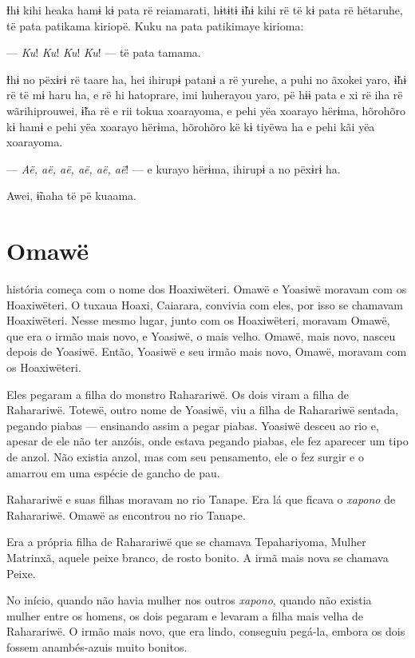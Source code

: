 Ɨhɨ kihi heaka hamɨ kɨ pata rë reiamarati, hɨtɨtɨ ɨ̃hɨ kihi rë të kɨ pata
rë hëtaruhe, të pata patikama kiriopë. Kuku na pata patikimaye kirioma:

--- \textit{Ku}! \textit{Ku}! \textit{Ku}! \textit{Ku}! --- të pata tamama. 

Ɨhɨ no pëxɨrɨ rë taare ha, hei ihirupɨ patanɨ a rë yurehe, a puhi no
ãxokei yaro, ɨ̃hɨ rë të mɨ haru ha, e rë hi hatoprare, imi huherayou
yaro, pë hɨɨ pata e xi rë iha rë wãrihiprouwei, ɨ̃ha rë e rii tokua
xoarayoma, e pehi yëa xoarayo hërɨma, hõrohõro kɨ hamɨ e pehi yëa
xoarayo hërɨma, hõrohõro kë kɨ tiyëwa ha e pehi kãi yëa xoarayoma. 

--- \textit{Aë, aë, aë, aë, aë, aë}! --- e kurayo hërɨma, ihirupɨ a no pëxɨrɨ ha. 

Awei, ɨ̃naha të pë kuaama. 

\chapter{Omawë}

 história começa com o nome dos Hoaxiwëteri. Omawë e Yoasiwë moravam
com os Hoaxiwëteri. O tuxaua Hoaxi, Caiarara, convivia com eles, por isso se
chamavam Hoaxiwëteri. Nesse mesmo lugar, junto com os Hoaxiwëteri,
moravam Omawë, que era o irmão mais novo, e Yoasiwë, o mais velho.
Omawë, mais novo, nasceu depois de Yoasiwë. Então, Yoasiwë e seu irmão
mais novo, Omawë, moravam com os Hoaxiwëteri.

Eles pegaram a filha do monstro Raharariwë. Os dois viram a filha de
Raharariwë. Totewë, outro nome de Yoasiwë, viu a filha de Raharariwë
sentada, pegando piabas --- ensinando assim a pegar piabas. Yoasiwë
desceu ao rio e, apesar de ele não ter anzóis, onde estava pegando
piabas, ele fez aparecer um tipo de anzol. Não existia anzol, mas com
seu pensamento, ele o fez surgir e o amarrou em uma espécie de gancho de pau.

Raharariwë e suas filhas moravam no rio Tanape. Era lá que ficava o
\textit{xapono} de Raharariwë. Omawë as encontrou no rio Tanape. 

Era a própria filha de Raharariwë que se chamava Tepahariyoma, Mulher Matrinxã, 
aquele peixe branco, de rosto bonito. A irmã mais nova se chamava Peixe. 

No início, quando não havia mulher nos outros \textit{xapono}, quando não existia
mulher entre os homens, os dois pegaram e levaram a filha mais velha de
Raharariwë. O irmão mais novo, que era lindo, conseguiu pegá-la, embora
os dois fossem anambés-azuis muito bonitos. 

